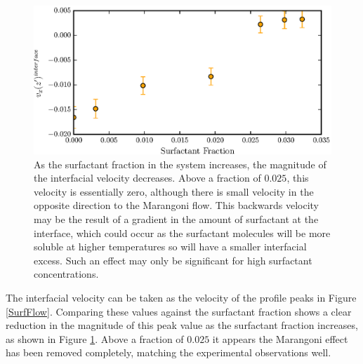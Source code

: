 \begin{figure}[h]
\centering
\includegraphics[scale=0.8]{InterVel}
\caption{As the surfactant fraction in the system increases, the magnitude of the interfacial velocity decreases.
Above a fraction of $0.025$, this velocity is essentially zero, although there is small velocity in the opposite direction to the Marangoni flow.
This backwards velocity may be the result of a gradient in the amount of surfactant at the interface, which could occur as the surfactant molecules will be more soluble at higher temperatures so will have a smaller interfacial excess.
Such an effect may only be significant for high surfactant concentrations.
}
\label{InterVel}
\end{figure}
The interfacial velocity can be taken as the velocity of the profile peaks in Figure \ref{SurfFlow}.
Comparing these values against the surfactant fraction shows a clear reduction in the magnitude of this peak value as the surfactant fraction increases, as shown in Figure \ref{InterVel}.
Above a fraction of $0.025$ it appears the Marangoni effect has been removed completely, matching the experimental observations well.

